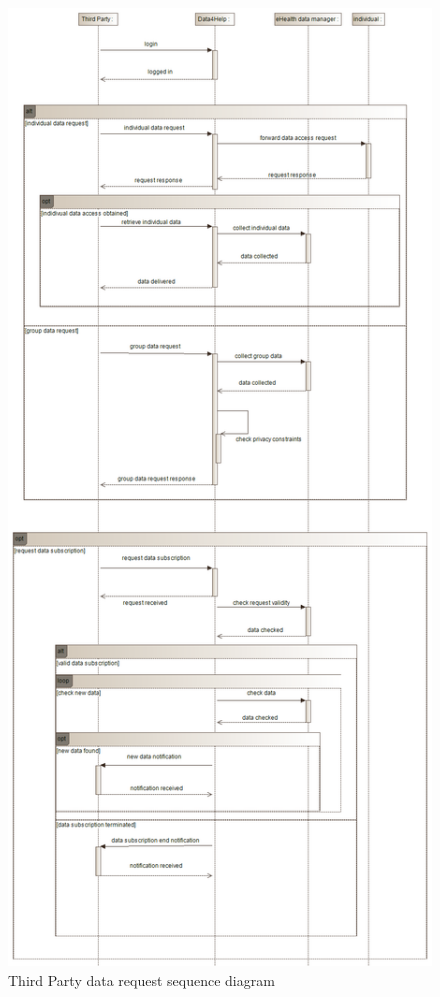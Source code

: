 \begin{figure}[H]
	\centering
  \includegraphics[width=0.70\linewidth]{resources/UML/ThirdPartyDataRequest.png}
  \caption{Third Party data request sequence diagram}
  \label{fig: ThirdParty sequence diagram}
\end{figure}

